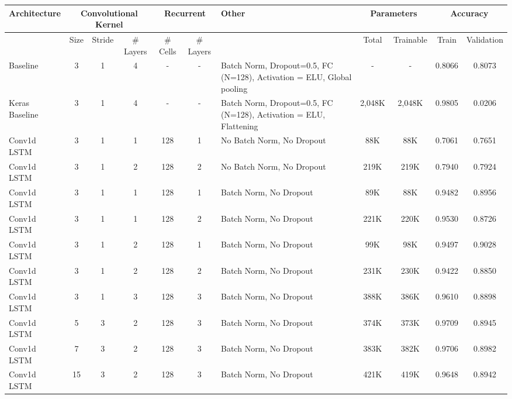 \documentclass{article}
\begin{document}
\begin{table}
  \resizebox{\textwidth}{!} {
    \begin{tabular} { |m{3cm}|c|c|c|c|c|m{3cm}|c|c|c|c| }
      \hline
      Architecture & \multicolumn{3}{|c|}{Convolutional Kernel} &
      \multicolumn{2}{|c|}{Recurrent} & Other &
      \multicolumn{2}{|c|}{Parameters} & \multicolumn{2}{|c|}{Accuracy} \\
      \hline
      & Size & Stride & \# Layers &
      \# Cells & \# Layers & &
      Total & Trainable & Train & Validation \\ \hline
      \hline
      Baseline & 3 & 1 & 4 &
      - & - & Batch Norm, Dropout=0.5, FC (N=128), Activation =
      ELU, Global pooling &
      - & - & 0.8066 & 0.8073 \\ \hline
      \hline
      Keras Baseline & 3 & 1 & 4 &
      - & - & Batch Norm, Dropout=0.5, FC (N=128), Activation =
      ELU, Flattening &
      2,048K & 2,048K & 0.9805 & 0.0206 \\ \hline
      \hline
      Conv1d LSTM & 3 & 1 & 1 &
      128 & 1 & No Batch Norm, No Dropout &
      88K & 88K & 0.7061 & 0.7651 \\ \hline
      Conv1d LSTM & 3 & 1 & 2 &
      128 & 2 & No Batch Norm, No Dropout &
      219K & 219K & 0.7940 & 0.7924 \\ \hline
      Conv1d LSTM & 3 & 1 & 1 &
      128 & 1 & Batch Norm, No Dropout &
      89K & 88K & 0.9482 & 0.8956 \\ \hline
      Conv1d LSTM & 3 & 1 & 1 &
      128 & 2 & Batch Norm, No Dropout &
      221K & 220K & 0.9530 & 0.8726 \\ \hline
      Conv1d LSTM & 3 & 1 & 2 &
      128 & 1 & Batch Norm, No Dropout &
      99K & 98K & 0.9497 & 0.9028 \\ \hline
      Conv1d LSTM & 3 & 1 & 2 &
      128 & 2 & Batch Norm, No Dropout &
      231K & 230K & 0.9422 & 0.8850 \\ \hline
      Conv1d LSTM & 3 & 1 & 3 &
      128 & 3 & Batch Norm, No Dropout &
      388K & 386K & 0.9610 & 0.8898 \\ \hline
      \hline
      Conv1d LSTM & 5 & 3 & 2 &
      128 & 3 & Batch Norm, No Dropout &
      374K & 373K & 0.9709 & 0.8945 \\ \hline
      Conv1d LSTM & 7 & 3 & 2 &
      128 & 3 & Batch Norm, No Dropout &
      383K & 382K & 0.9706 & 0.8982 \\ \hline
      Conv1d LSTM & 15 & 3 & 2 &
      128 & 3 & Batch Norm, No Dropout &
      421K & 419K & 0.9648 & 0.8942 \\ \hline

\end{tabular}}
\end{table}
\end{document}
